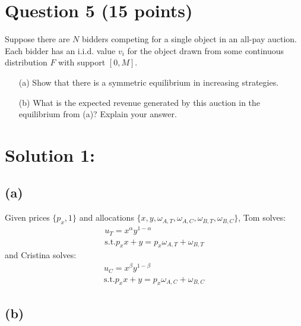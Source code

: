 \documentclass[10pt,a4paper]{article}
\begin{document}
\section*{Question 5 (15 points)}
Suppose there are $N$ bidders competing for a single object in an all-pay auction. Each bidder has an i.i.d. value $v_i$ for the object drawn from some continuous distribution $F$ with support $[0, M]$.
\begin{enumerate}
    \item[(a)] Show that there is a symmetric equilibrium in increasing strategies.
    \item[(b)] What is the expected revenue generated by this auction in the equilibrium from (a)? Explain your answer.
\end{enumerate}
\section*{Solution 1:}
    \subsection*{(a)}
      Given prices $\{p_x, 1\}$ and allocations $\{x,y,\omega_{A,T}, \omega_{A,C}, \omega_{B, T}, \omega_{B,C}\}$, 
      Tom solves:
      \begin{gather*}
          u_T = x^{\alpha}y^{1-\alpha} \\
          \text{s.t.}
          p_xx + y = p_x\omega_{A,T} + \omega_{B,T}
      \end{gather*}
      and Cristina solves:
      \begin{gather*}
          u_C = x^{\beta}y^{1-\beta} \\
          \text{s.t.}
          p_xx + y = p_x\omega_{A,C} + \omega_{B,C}
      \end{gather*}
    \subsection*{(b)}
      
\end{document}
